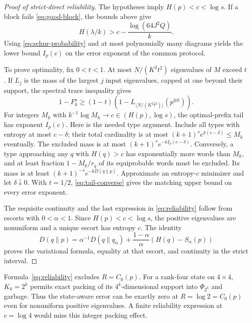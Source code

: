 \begin{proof}[Proof of strict-direct reliability]
The hypotheses imply $H(p)<c<\log s$. If a block fails \eqref{eq:good-block}, the bounds above give
\[
 H(\lambda/k)>c-\frac{\log(64J^2Q)}k.
\]
Using \eqref{eq:schur-probability} and at most polynomially many diagrams yields the lower bound $I_p(c)$ on the error exponent of the common protocol.

To prove optimality, fix $0<t<1$. At most $N/(K^2t^2)$ eigenvalues of $M$ exceed $t$. If $L_j$ is the mass of the largest $j$ input eigenvalues, capped at one beyond their support, the spectral trace inequality gives
\begin{equation}\label{eq:tail-converse}
 1-F_k^\star\ge(1-t)
 \left(1-L_{\lfloor N/(K^2t^2)\rfloor}(p^{\otimes k})\right).
\end{equation}
For integers $M_k$ with $k^{-1}\log M_k\to c\in(H(p),\log s)$, the optimal-prefix tail has exponent $I_p(c)$. Here is the needed type argument. Include all types with entropy at most $c-\delta$; their total cardinality is at most $(k+1)^s e^{k(c-\delta)}\le M_k$ eventually. The excluded mass is at most $(k+1)^s e^{-kI_p(c-\delta)}$. Conversely, a type approaching any $q$ with $H(q)>c$ has exponentially more words than $M_k$, and at least fraction $1-M_k/r_q$ of its equiprobable words must be excluded. Its mass is at least $(k+1)^{-s}e^{-kD(q\|p)}$. Approximate an entropy-$c$ minimizer and let $\delta\downarrow0$. With $t=1/2$, \eqref{eq:tail-converse} gives the matching upper bound on every error exponent.

The requisite continuity and the last expression in \eqref{eq:reliability} follow from escorts with $0<\alpha<1$. Since $H(p)<c<\log s$, the positive eigenvalues are nonuniform and a unique escort has entropy $c$. The identity
\[
 D(q\|p)=\alpha^{-1}D(q\|q_\alpha)
 +\frac{1-\alpha}{\alpha}(H(q)-S_\alpha(p))
\]
proves the variational formula, equality at that escort, and continuity in the strict interval.
\end{proof}

\begin{remark}
Formula~\eqref{eq:reliability} excludes $R=C_0(p)$. For a rank-four state on $4\times4$, $K_k=2^k$ permits exact packing of its $4^k$-dimensional support into $\Phi_{2^k}$ and garbage. Thus the state-aware error can be exactly zero at $R=\log2=C_0(p)$ even for nonuniform positive eigenvalues. A finite reliability expression at $c=\log4$ would miss this integer packing effect.
\end{remark}

